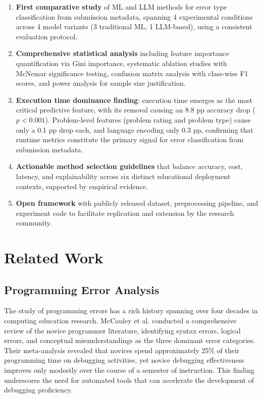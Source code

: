 \documentclass[10pt,letterpaper]{article}
\begin{document}
\begin{enumerate}
    \item \textbf{First comparative study} of ML and LLM methods for error
          type classification from submission metadata, spanning 4
          experimental conditions across 4 model variants (3 traditional ML,
          1 LLM-based), using a consistent evaluation protocol.
    \item \textbf{Comprehensive statistical analysis} including feature
          importance quantification via Gini importance, systematic ablation
          studies with McNemar significance testing, confusion matrix analysis
          with class-wise F1 scores, and power analysis for sample size
          justification.
    \item \textbf{Execution time dominance finding}: execution time emerges as
          the most critical predictive feature, with its removal causing an 8.8 pp
          accuracy drop ($p < 0.001$). Problem-level features (problem rating and
          problem type) cause only a 0.1 pp drop each, and language encoding only
          0.3 pp, confirming that runtime metrics constitute the primary signal for error classification
          from submission metadata.
    \item \textbf{Actionable method selection guidelines} that balance
          accuracy, cost, latency, and explainability across six distinct
          educational deployment contexts, supported by empirical evidence.
    \item \textbf{Open framework} with publicly released dataset, preprocessing
          pipeline, and experiment code to facilitate replication and
          extension by the research community.
\end{enumerate}

\section{Related Work}


\subsection{Programming Error Analysis}

The study of programming errors has a rich history spanning over four decades
in computing education research. McCauley et al. \cite{mccauley2008evidence}
conducted a comprehensive review of the novice programmer literature, identifying
syntax errors, logical errors, and conceptual misunderstandings as the three
dominant error categories. Their meta-analysis revealed that novices spend
approximately 25\% of their programming time on debugging activities, yet
novice debugging effectiveness improves only modestly over the course of a semester
of instruction. This finding underscores the need for automated tools that can
accelerate the development of debugging proficiency.
\end{document}
